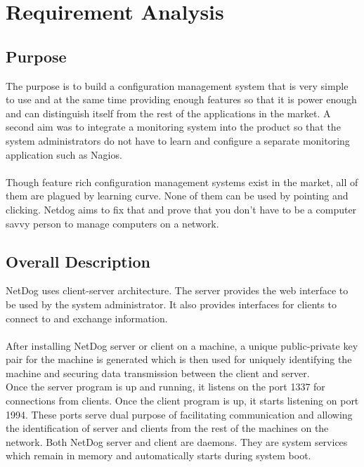 \chapter{Requirement Analysis}

\section{Purpose}

The purpose is to build a configuration management system that is very simple to
use and at the same time providing enough features so that it is power enough
and can distinguish itself from the rest of the applications in the market. A
second aim was to integrate a monitoring system into the product so that the
system administrators do not have to learn and configure a separate monitoring
application such as Nagios.
\\\\
Though feature rich configuration management systems exist in the market, all of
them are plagued by learning curve. None of them can be used by pointing and
clicking. Netdog aims to fix that and prove that you don't have to be a computer
savvy person to manage computers on a network.

\section{Overall Description}

NetDog uses client-server architecture. The server provides the web interface to
be used by the system administrator. It also provides interfaces for clients to
connect to and exchange information.
\\\\
After installing NetDog server or client on a machine, a unique public-private
key pair for the machine is generated which is then used for uniquely
identifying the machine and securing data transmission between the client and
server.\\

Once the server program is up and running, it listens on the port 1337 for
connections from clients. Once the client program is up, it starts listening on
port 1994. These ports serve dual purpose of facilitating communication and
allowing the identification of server and clients from the rest of the machines
on the network. Both NetDog server and client are daemons. They are system 
services which remain in memory and automatically starts during system boot.\\

